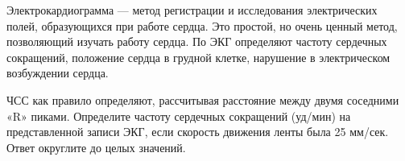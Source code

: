 
Электрокардиограмма
— метод регистрации и исследования электрических полей, образующихся при работе
сердца. Это простой, но очень ценный метод, позволяющий изучать работу сердца.
По ЭКГ определяют частоту сердечных сокращений, положение сердца в грудной
клетке, нарушение в электрическом возбуждении сердца.


ЧСС как правило определяют,
рассчитывая расстояние между двумя соседними «R» пиками. Определите частоту
сердечных сокращений (уд/мин) на представленной записи ЭКГ, если скорость
движения ленты была 25 мм/сек. Ответ округлите до целых значений.

\explanationSection

